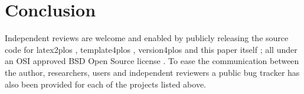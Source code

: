 \section*{Conclusion}

\finishsection

Independent reviews are welcome and enabled by publicly releasing the source code for latex2plos \cite{latex2plos}, template4plos \cite{template4plos}, version4plos \cite{version4plos} and this paper itself \cite{paper:code}; all under an OSI approved BSD Open Source license \cite{OSI:BSD}.
To ease the communication between the author, researchers, users and independent reviewers a public bug tracker has also been provided for each of the projects listed above.
